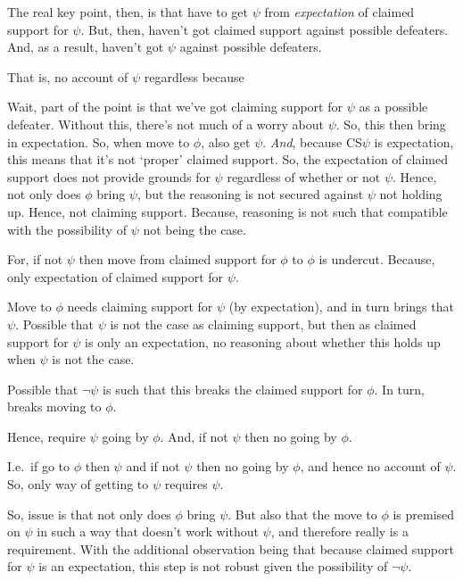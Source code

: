 \begin{note}
  The real key point, then, is that have to get \(\psi\) from \emph{expectation} of claimed support for \(\psi\).
  But, then, haven't got claimed support against possible defeaters.
  And, as a result, haven't got \(\psi\) against possible defeaters.

  That is, no account of \(\psi\) regardless because

  Wait, part of the point is that we've got claiming support for \(\psi\) as a possible defeater.
  Without this, there's not much of a worry about \(\psi\).
  So, this then bring in expectation.
  So, when move to \(\phi\), also get \(\psi\).
  \emph{And}, because CS\(\psi\) is expectation, this means that it's not `proper' claimed support.
  So, the expectation of claimed support does not provide grounds for \(\psi\) regardless of whether or not \(\psi\).
  Hence, not only does \(\phi\) bring \(\psi\), but the reasoning is not secured against \(\psi\) not holding up.
  Hence, not claiming support.
  Because, reasoning is not such that compatible with the possibility of \(\psi\) not being the case.

  For, if not \(\psi\) then move from claimed support for \(\phi\) to \(\phi\) is undercut.
  Because, only expectation of claimed support for \(\psi\).

  Move to \(\phi\) needs claiming support for \(\psi\) (by expectation), and in turn brings that \(\psi\).
  Possible that \(\psi\) is not the case as claiming support, but then as claimed support for \(\psi\) is only an expectation, no reasoning about whether this holds up when \(\psi\) is not the case.

  Possible that \(\lnot\psi\) is such that this breaks the claimed support for \(\phi\).
  In turn, breaks moving to \(\phi\).

  Hence, require \(\psi\) going by \(\phi\).
  And, if not \(\psi\) then no going by \(\phi\).

  I.e.\ if go to \(\phi\) then \(\psi\) and if not \(\psi\) then no going by \(\phi\), and hence no account of \(\psi\).
  So, only way of getting to \(\psi\) requires \(\psi\).

  So, issue is that not only does \(\phi\) bring \(\psi\).
  But also that the move to \(\phi\) is premised on \(\psi\) in such a way that doesn't work without \(\psi\), and therefore really is a requirement.
  With the additional observation being that because claimed support for \(\psi\) is an expectation, this step is not robust given the possibility of \(\lnot\psi\).
\end{note}

